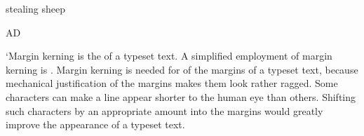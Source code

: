 \documentclass{memoir}
\begin{document}
{\lsstyle stealing sheep}

AD


 `Margin kerning is the  of a
  typeset text. A simplified employment of margin kerning is . Margin kerning is needed for  of the margins
  of a typeset text, because mechanical justification of the margins makes
  them look rather ragged. Some characters can make a line appear shorter to
  the human eye than others. Shifting such characters by an appropriate
  amount into the margins would greatly improve the appearance of a typeset
  text.
\end{document}
